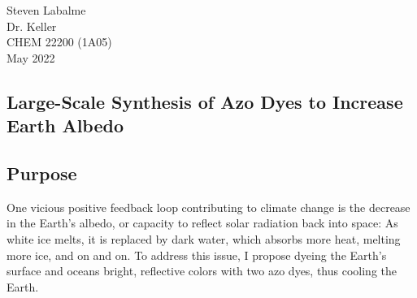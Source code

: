 \documentclass{article}
\begin{document}
\noindent Steven Labalme\\
\noindent Dr. Keller\\
\noindent CHEM 22200 (1A05)\\
 May 2022

\begin{center}
    \section*{Large-Scale Synthesis of Azo Dyes to Increase Earth Albedo}
\end{center}
\subsection*{Purpose}
One vicious positive feedback loop contributing to climate change is the decrease in the Earth's albedo, or capacity to reflect solar radiation back into space: As white ice melts, it is replaced by dark water, which absorbs more heat, melting more ice, and on and on. To address this issue, I propose dyeing the Earth's surface and oceans bright, reflective colors with two azo dyes, thus cooling the Earth.
\end{document}
